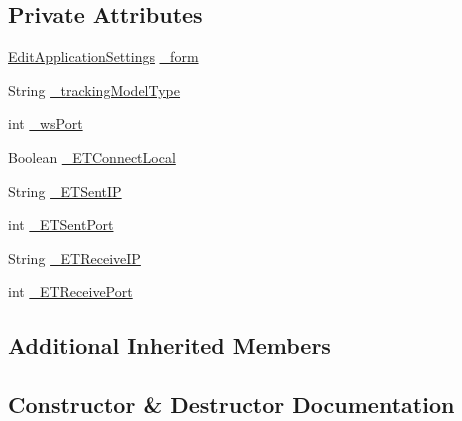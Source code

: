 \subsection*{Private Attributes}
\begin{DoxyCompactItemize}
\item 
\hyperlink{class_web_analyzer_1_1_u_i_1_1_edit_application_settings}{Edit\+Application\+Settings} \hyperlink{class_web_analyzer_1_1_u_i_1_1_interaction_objects_1_1_application_settings_obj_a6b08a377c6dc1e9f0e32d0c786012756}{\+\_\+form}
\item 
String \hyperlink{class_web_analyzer_1_1_u_i_1_1_interaction_objects_1_1_application_settings_obj_a46f28947ac5d858f82d174097a42f7ac}{\+\_\+tracking\+Model\+Type}
\item 
int \hyperlink{class_web_analyzer_1_1_u_i_1_1_interaction_objects_1_1_application_settings_obj_aa8f8de8781d5d9fb22fa8b1d35ccf731}{\+\_\+ws\+Port}
\item 
Boolean \hyperlink{class_web_analyzer_1_1_u_i_1_1_interaction_objects_1_1_application_settings_obj_aa7925653fa500c2ca2eeba8196660b30}{\+\_\+\+E\+T\+Connect\+Local}
\item 
String \hyperlink{class_web_analyzer_1_1_u_i_1_1_interaction_objects_1_1_application_settings_obj_a523492d96f79d39503cb98640c567169}{\+\_\+\+E\+T\+Sent\+I\+P}
\item 
int \hyperlink{class_web_analyzer_1_1_u_i_1_1_interaction_objects_1_1_application_settings_obj_a8101f556b9e66c46b27ade6cb57bdddd}{\+\_\+\+E\+T\+Sent\+Port}
\item 
String \hyperlink{class_web_analyzer_1_1_u_i_1_1_interaction_objects_1_1_application_settings_obj_a0c3a4992e4a62a97fc4623d379dfb7fb}{\+\_\+\+E\+T\+Receive\+I\+P}
\item 
int \hyperlink{class_web_analyzer_1_1_u_i_1_1_interaction_objects_1_1_application_settings_obj_af713c0586e6436616248aa95beac0c1c}{\+\_\+\+E\+T\+Receive\+Port}
\end{DoxyCompactItemize}
\subsection*{Additional Inherited Members}


\subsection{Constructor \& Destructor Documentation}
\hypertarget{class_web_analyzer_1_1_u_i_1_1_interaction_objects_1_1_application_settings_obj_a0642bb10f6b638fd83af16a36717a1b4}{}

